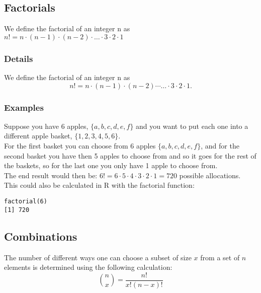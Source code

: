\documentclass[12pt,a4paper]{article}
\theoremstyle{regla}
\theoremstyle{remark}
\theoremstyle{definition}
\theoremstyle{nonumberbreak}
\begin{document}
\subsection{Factorials}
\begin{fbox}
\begin{minipage}{0.97\textwidth}
We define the factorial of an integer n as \\
$n!= n\cdot(n-1) \cdot(n-2)\cdot \ldots \cdot 3 \cdot 2 \cdot 1$

\end{minipage}
\end{fbox}
\subsubsection{Details}
\begin{defn}
We define the factorial of an integer n as
$$
n!= n\cdot(n-1) \cdot(n-2)\cdots \ldots \cdot 3 \cdot 2 \cdot 1 .
$$
\end{defn}
\subsubsection{Examples}
\begin{xmpl}

Suppose you have 6 apples, $\{a, b, c, d, e, f\}$ and you 
want to put each one into a different apple basket, $\{1,2,3,4,5,6\}$.\\

For the first basket you can choose from 6 apples $\{a, b, c, d, e,f\}$,
and for the second basket you have then 5 apples to choose from
and so it goes for the rest of the baskets, so for the last one you
only have 1 apple to choose from.\\

The end result would then be: 
$6! = 6 \cdot 5 \cdot 4 \cdot 3 \cdot 2 \cdot 1 = 720$ possible allocations.\\

This could also be calculated in R with the factorial function:
\begin{lstlisting}
factorial(6)
[1] 720
\end{lstlisting}
\end{xmpl}


\subsection{Combinations}
\begin{fbox}
\begin{minipage}{0.97\textwidth}
The number of different ways one can choose a subset of size $x$ from a set of $n$ elements is determined using the following calculation:
$$
{n \choose x}= \frac{{n!}}{{x!\left( {n - x} \right)!}}
$$

\end{minipage}
\end{fbox}
\end{document}
